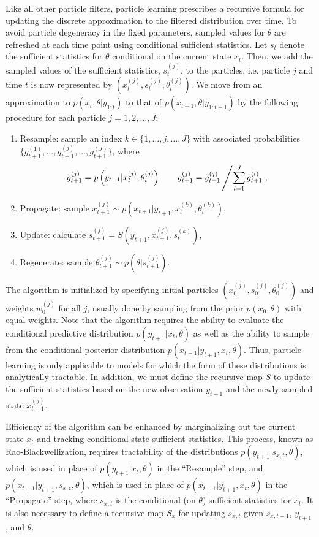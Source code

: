 \documentclass{article}
\begin{document}
Like all other particle filters, particle learning prescribes a recursive formula for updating the discrete approximation to the filtered distribution over time. To avoid particle degeneracy in the fixed parameters, sampled values for $\theta$ are refreshed at each time point using conditional sufficient statistics. Let $s_t$ denote the sufficient statistics for $\theta$ conditional on the current state $x_t$. Then, we add the sampled values of the sufficient statistics, $s_t^{(j)}$, to the particles, i.e. particle $j$ and time $t$ is now represented by $\left(x_t^{(j)},s_t^{(j)},\theta_t^{(j)}\right)$. We move from an approximation to $p(x_t,\theta|y_{1:t})$ to that of $p(x_{t+1},\theta|y_{1:t+1})$ by the following procedure for each particle $j = 1,2,\ldots,J$:
\begin{enumerate}
\item Resample: sample an index $k \in \{1,\ldots,j,\ldots,J\}$ with associated probabilities $\{g_{t+1}^{(1)},\ldots,g_{t+1}^{(j)},\ldots,g_{t+1}^{(J)}\}$, where \[\tilde{g}_{t+1}^{(j)} = p\left(y_{t+1}|x_t^{(j)},\theta_t^{(j)}\right) \qquad g_{t+1}^{(j)} = \tilde{g}_{t+1}^{(j)} \left/ \sum_{l=1}^J \tilde{g}_{t+1}^{(l)}\right.,\]
\item Propagate: sample $x_{t+1}^{(j)} \sim p\left(x_{t+1}|y_{t+1},x_t^{(k)},\theta_t^{(k)}\right)$,
\item Update: calculate $s_{t+1}^{(j)} = S\left(y_{t+1},x_{t+1}^{(j)},s_t^{(k)}\right)$,
\item Regenerate: sample $\theta_{t+1}^{(j)} \sim p\left(\theta|s_{t+1}^{(j)}\right)$.
\end{enumerate}
The algorithm is initialized by specifying initial particles $\left(x_0^{(j)},s_0^{(j)},\theta_0^{(j)}\right)$ and weights $w_0^{(j)}$ for all $j$, usually done by sampling from the prior $p(x_0,\theta)$ with equal weights. Note that the algorithm requires the ability to evaluate the conditional predictive distribution $p(y_{t+1}|x_t,\theta)$ as well as the ability to sample from the conditional posterior distribution $p(x_{t+1}|y_{t+1},x_t,\theta)$. Thus, particle learning is only applicable to models for which the form of these distributions is analytically tractable. In addition, we must define the recursive map $S$ to update the sufficient statistics based on the new observation $y_{t+1}$ and the newly sampled state $x_{t+1}^{(j)}$.

Efficiency of the algorithm can be enhanced by marginalizing out the current state $x_t$ and tracking conditional state sufficient statistics. This process, known as Rao-Blackwellization, requires tractability of the distributions $p(y_{t+1}|s_{x,t},\theta)$, which is used in place of $p(y_{t+1}|x_t,\theta)$ in the ``Resample'' step, and $p(x_{t+1}|y_{t+1},s_{x,t},\theta)$, which is used in place of $p(x_{t+1}|y_{t+1},x_t,\theta)$ in the ``Propagate'' step, where $s_{x,t}$ is the conditional (on $\theta$) sufficient statistics for $x_t$. It is also necessary to define a recursive map $S_x$ for updating $s_{x,t}$ given $s_{x,t-1}$, $y_{t+1}$, and $\theta$.
\end{document}
